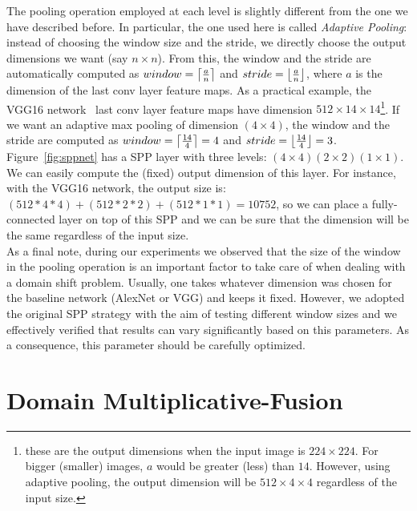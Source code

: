 \documentclass[../main.tex]{subfiles}
\begin{document}
    The pooling operation employed at each level is slightly different from the
    one we have described before. In particular, the one used here is called \textit{Adaptive Pooling}: instead of choosing the window size and the
    stride, we directly choose the output dimensions we want (say $n \times n$). From this, the window and the stride are automatically computed
    as $window = \ceil*{\frac{a}{n}}$ and $stride = \floor*{\frac{a}{n}}$, where $a$ is the dimension of the last conv layer feature maps. As a
    practical example, the VGG16 network~\cite{vgg16} last conv layer feature maps have dimension $512 \times 14 \times 14$\footnote{these are
    the output dimensions when the input image is $224 \times 224$. For bigger (smaller) images, $a$ would be greater (less) than $14$.
    However, using adaptive pooling, the output dimension will be $512 \times 4 \times 4$ regardless of the input size.}.
    If we want an adaptive max pooling of dimension $(4 \times 4)$, the window and the stride are computed as
    $window = \ceil*{\frac{14}{4}} = 4$ and $stride = \floor*{\frac{14}{4}} = 3$. Figure~\ref{fig:sppnet} has a SPP layer with three levels:
    $(4 \times 4) (2 \times 2) (1 \times 1)$. We can easily compute the (fixed) output dimension of this layer. For instance, with the VGG16
    network, the output size is: $(512*4*4) + (512*2*2) + (512*1*1) = 10752$, so we can place a fully-connected layer on top of this SPP and
    we can be sure that the dimension will be the same regardless of the input size. \\

	As a final note, during our experiments we observed that the size of the window in the pooling operation is an important factor to take care of
	when dealing with a domain shift problem. Usually, one takes whatever dimension was chosen for the baseline network (AlexNet or VGG)
	and keeps it fixed. However, we adopted the original SPP strategy with the aim of testing different window sizes and we effectively
	verified that results can vary significantly based on this parameters. As a consequence, this parameter should be carefully optimized.

    \section{Domain Multiplicative-Fusion}\label{sec:dmf-network}
\end{document}
